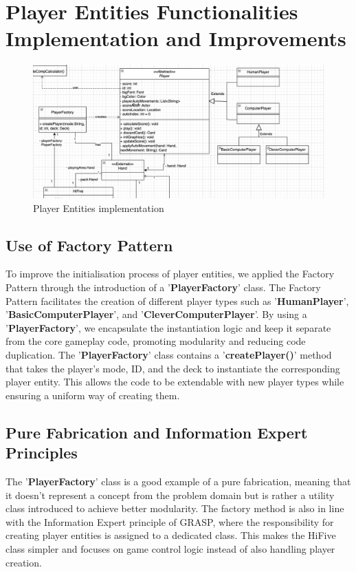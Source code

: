 \documentclass[a4paper, 12pt]{report}
\begin{document}
    \section{Player Entities Functionalities Implementation and Improvements}
    \begin{figure}[htbp]
        \centering
        \includegraphics[width=1\linewidth]{player.png}
        \caption{Player Entities implementation}
        \label{fig:enter-label}
    \end{figure}
    \subsection{Use of Factory Pattern}
    To improve the initialisation process of player entities, we applied the Factory Pattern through the introduction of a '\textbf{PlayerFactory}' class. The Factory Pattern facilitates the creation of different player types such as '\textbf{HumanPlayer}', '\textbf{BasicComputerPlayer}', and '\textbf{CleverComputerPlayer}'. By using a '\textbf{PlayerFactory}', we encapsulate the instantiation logic and keep it separate from the core gameplay code, promoting modularity and reducing code duplication. The '\textbf{PlayerFactory}' class contains a '\textbf{createPlayer()}' method that takes the player's mode, ID, and the deck to instantiate the corresponding player entity. This allows the code to be extendable with new player types while ensuring a uniform way of creating them.
    
    \subsection{Pure Fabrication and Information Expert Principles}
    The '\textbf{PlayerFactory}' class is a good example of a pure fabrication, meaning that it doesn't represent a concept from the problem domain but is rather a utility class introduced to achieve better modularity. The factory method is also in line with the Information Expert principle of GRASP, where the responsibility for creating player entities is assigned to a dedicated class. This makes the HiFive class simpler and focuses on game control logic instead of also handling player creation.
    
\end{document}
